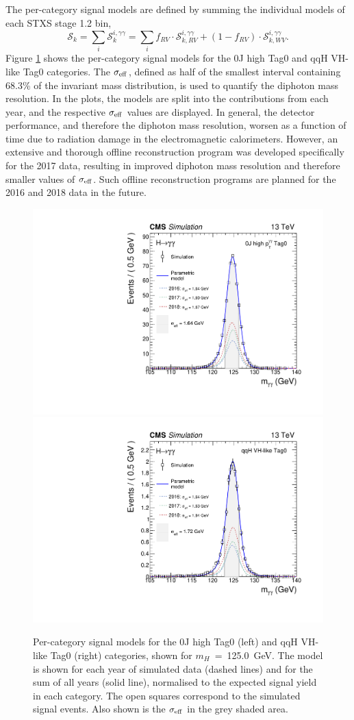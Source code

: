 The per-category signal models are defined by summing the individual models of each STXS stage 1.2 bin,
\begin{equation}
    \mathcal{S}_k = \sum_i \mathcal{S}^{i,\gamma\gamma}_k = \sum_i f_{RV} \cdot \mathcal{S}^{i,\gamma\gamma}_{k,RV} + (1-f_{RV}) \cdot\mathcal{S}^{i,\gamma\gamma}_{k,WV}.
\end{equation}
\noindent
Figure \ref{fig:sigmodels_category} shows the per-category signal models for the 0J high \ptH Tag0 and qqH VH-like Tag0 categories. The $\sigma_{\rm{eff}}$, defined as half of the smallest interval containing 68.3\% of the invariant mass distribution, is used to quantify the diphoton mass resolution. In the plots, the models are split into the contributions from each year, and the respective $\sigma_{\rm{eff}}$ values are displayed. In general, the detector performance, and therefore the diphoton mass resolution, worsen as a function of time due to radiation damage in the electromagnetic calorimeters. However, an extensive and thorough offline reconstruction program was developed specifically for the 2017 data, resulting in improved diphoton mass resolution and therefore smaller values of $\sigma_{\rm{eff}}$. Such offline reconstruction programs are planned for the 2016 and 2018 data in the future. 

\begin{figure}[hptb]
  \centering
  \includegraphics[width=.49\textwidth]{Figures/hgg_stats/smodel_RECO_0J_PTH_GT10_Tag0.pdf}
  \hfill
  \includegraphics[width=.49\textwidth]{Figures/hgg_stats/smodel_RECO_VBFTOPO_VHHAD_Tag0.pdf}
  \caption[Signal models for the 0J high \ptgg Tag0 and qqH VH-like Tag0 categories]
  {
    Per-category signal models for the 0J high \ptH Tag0 (left) and qqH VH-like Tag0 (right) categories, shown for $m_H$~=~125.0~GeV. The model is shown for each year of simulated data (dashed lines) and for the sum of all years (solid line), normalised to the expected signal yield in each category. The open squares correspond to the simulated signal events. Also shown is the $\sigma_{\rm{eff}}$ in the grey shaded area. 
  }
  \label{fig:sigmodels_category}
\end{figure}

